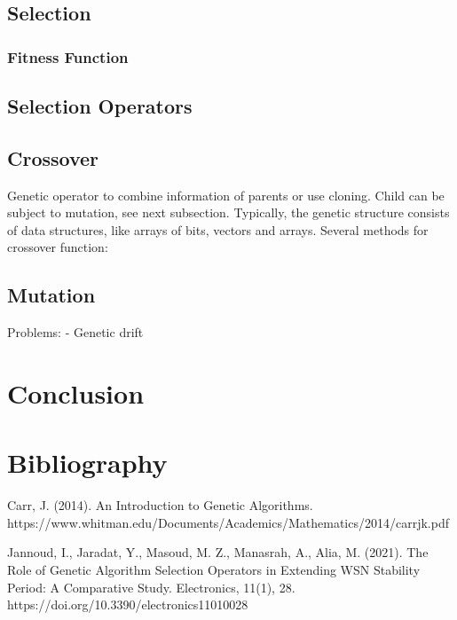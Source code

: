 \documentclass{article}
\begin{document}
\bigskip
\subsection{Selection}


\bigskip
\subsubsection{Fitness Function}

\subsection{Selection Operators}
\bigskip
\subsection{Crossover}
Genetic operator to combine information of parents or use cloning. Child can be subject to mutation, see next subsection. Typically, the genetic structure consists of data structures, like arrays of bits, vectors and arrays.\smallbreak
Several methods for crossover function:

\bigskip
\subsection{Mutation}
Problems:
- Genetic drift
\newpage
\section{Conclusion}

\newpage
\section{Bibliography}
Carr, J. (2014). An Introduction to Genetic Algorithms.\smallbreak
https://www.whitman.edu/Documents/Academics/Mathematics/2014/carrjk.pdf

Jannoud, I., Jaradat, Y., Masoud, M. Z., Manasrah, A., Alia, M. (2021). The Role of Genetic Algorithm Selection Operators in Extending WSN Stability Period: A Comparative Study. Electronics, 11(1), 28. https://doi.org/10.3390/electronics11010028‌
\end{document}
